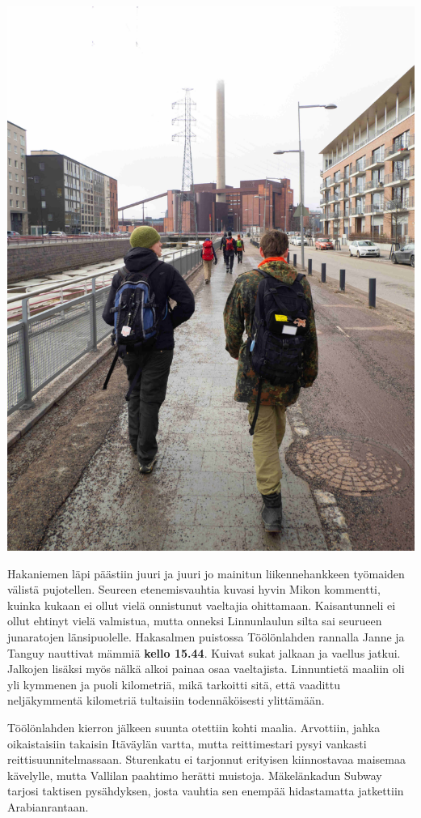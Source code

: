 \begin{multicols}{2}
	\noindent\includegraphics[width=\linewidth]{assets/nahkaliljakalasatama}

	Hakaniemen läpi päästiin juuri ja juuri jo mainitun liikennehankkeen
	työmaiden välistä pujotellen. Seureen etenemisvauhtia kuvasi hyvin
	Mikon kommentti, kuinka kukaan ei ollut vielä onnistunut vaeltajia
	ohittamaan. Kaisantunneli ei ollut ehtinyt vielä valmistua, mutta
	onneksi Linnunlaulun silta sai seurueen junaratojen länsipuolelle.
	Hakasalmen puistossa Töölönlahden rannalla Janne ja Tanguy nauttivat
	mämmiä \textbf{kello 15.44}. Kuivat sukat jalkaan ja vaellus jatkui.
	Jalkojen lisäksi myös nälkä alkoi painaa osaa vaeltajista. Linnuntietä
	maaliin oli yli kymmenen ja puoli kilometriä, mikä tarkoitti sitä, että
	vaadittu neljäkymmentä kilometriä tultaisiin todennäköisesti
	ylittämään.

	Töölönlahden kierron jälkeen suunta otettiin kohti maalia. Arvottiin,
	jahka oikaistaisiin takaisin Itäväylän vartta, mutta reittimestari
	pysyi vankasti reittisuunnitelmassaan. Sturenkatu ei tarjonnut
	erityisen kiinnostavaa maisemaa kävelylle, mutta Vallilan paahtimo
	herätti muistoja. Mäkelänkadun Subway tarjosi taktisen pysähdyksen,
	josta vauhtia sen enempää hidastamatta jatkettiin Arabianrantaan.


\end{multicols}
